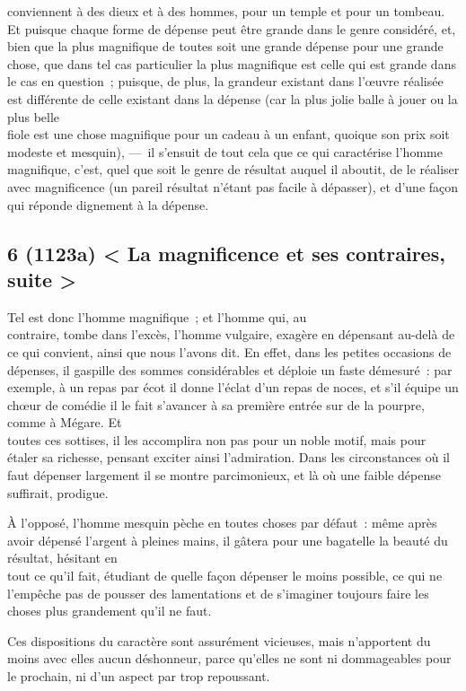 \documentclass[french,twoside]{book} %
\begin{document}
conviennent à des dieux et à des hommes, pour un temple et pour un tombeau. Et puisque chaque forme de dépense peut être grande dans le genre considéré, et, bien que la plus magnifique de toutes soit une grande dépense pour une grande chose, que dans tel cas particulier la plus magnifique est celle qui est grande dans le cas en question ; puisque, de plus, la grandeur existant dans l’œuvre réalisée est différente de celle existant dans la dépense (car la plus jolie balle à jouer ou la plus belle \\
fiole est une chose magnifique pour un cadeau à un enfant, quoique son prix soit modeste et mesquin), — il s’ensuit de tout cela que ce qui caractérise l’homme magnifique, c’est, quel que soit le genre de résultat auquel il aboutit, de le réaliser avec magnificence (un pareil résultat n’étant pas facile à dépasser), et d’une façon qui réponde dignement à la dépense.
\subsection[{6 (1123a) < La magnificence et ses contraires, suite >}]{6 (1123a) < La magnificence et ses contraires, suite >}
\noindent Tel est donc l’homme magnifique ; et l’homme qui, au \\
contraire, tombe dans l’excès, l’homme vulgaire, exagère en dépensant au-delà de ce qui convient, ainsi que nous l’avons dit. En effet, dans les petites occasions de dépenses, il gaspille des sommes considérables et déploie un faste démesuré : par exemple, à un repas par écot il donne l’éclat d’un repas de noces, et s’il équipe un chœur de comédie il le fait s’avancer à sa première entrée sur de la pourpre, comme à Mégare. Et \\
toutes ces sottises, il les accomplira non pas pour un noble motif, mais pour étaler sa richesse, pensant exciter ainsi l’admiration. Dans les circonstances où il faut dépenser largement il se montre parcimonieux, et là où une faible dépense suffirait, prodigue.\par
À l’opposé, l’homme mesquin pèche en toutes choses par défaut : même après avoir dépensé l’argent à pleines mains, il gâtera pour une bagatelle la beauté du résultat, hésitant en \\
tout ce qu’il fait, étudiant de quelle façon dépenser le moins possible, ce qui ne l’empêche pas de pousser des lamentations et de s’imaginer toujours faire les choses plus grandement qu’il ne faut.\par
Ces dispositions du caractère sont assurément vicieuses, mais n’apportent du moins avec elles aucun déshonneur, parce qu’elles ne sont ni dommageables pour le prochain, ni d’un aspect par trop repoussant.
\end{document}
